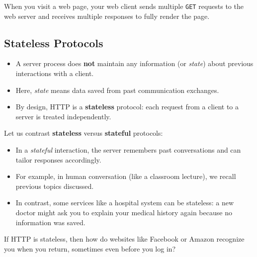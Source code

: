 \documentclass[../../compsys.tex]{subfiles}
\begin{document}
\vspace{10pt}

\noindent
When you visit a web page, your web client sends multiple \texttt{GET} requests to the web server and receives multiple responses to fully render the page.

\subsection{Stateless Protocols}

\begin{itemize}
    \item A server process does \textbf{not} maintain any information (or \textit{state}) about previous interactions with a client.
    \item Here, \textit{state} means data saved from past communication exchanges.
    \item By design, HTTP is a \textbf{stateless} protocol: each request from a client to a server is treated independently.
\end{itemize}
\noindent
Let us contrast \textbf{stateless} versus \textbf{stateful} protocols:

\begin{itemize}
    \item In a \textit{stateful} interaction, the server remembers past conversations and can tailor responses accordingly.
    \item For example, in human conversation (like a classroom lecture), we recall previous topics discussed.
    \item In contrast, some services like a hospital system can be stateless: a new doctor might ask you to explain your medical history again because no information was saved.
\end{itemize}
\noindent
If HTTP is stateless, then how do websites like Facebook or Amazon recognize you when you return, sometimes even before you log in?
\end{document}

